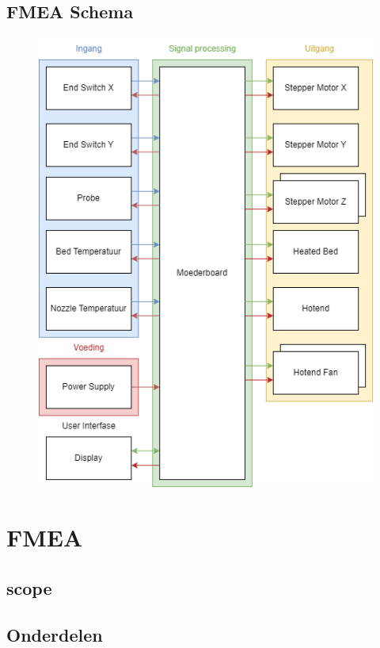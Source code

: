 \documentclass{article}
\begin{document}
\subsection{FMEA Schema}
\begin{figure}[H]
  \centering
  \includegraphics[width=\textwidth]{Creality Ender V2.drawio.png}
\end{figure}


\newpage

\section{FMEA}
\subsection{scope}
\subsection{Onderdelen}
\end{document}
